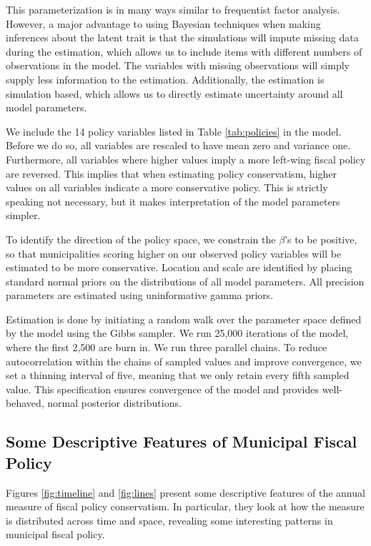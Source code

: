 \documentclass[a4paper,12pt]{article}
\begin{document}
This parameterization is in many ways similar to frequentist factor analysis. However, a major advantage to using Bayesian techniques when making inferences about the latent trait is that the simulations will impute missing data during the estimation, which allows us to include items with different numbers of observations in the model. The variables with missing observations will simply supply less information to the estimation. Additionally, the estimation is simulation based, which allows us to directly estimate uncertainty around all model parameters. 

We include the 14 policy variables listed in Table  \ref{tab:policies} in the model. Before we do so, all variables are rescaled to have mean zero and variance one. Furthermore, all variables where higher values imply a more left-wing fiscal policy are reversed. This implies that when estimating policy conservatism, higher values on all variables indicate a more conservative policy. This is strictly speaking not necessary, but it makes interpretation of the model parameters simpler.

To identify the direction of the policy space, we constrain the $\beta$'s to be positive, so that municipalities scoring higher on our observed policy variables will be estimated to be more conservative. Location and scale are identified by placing standard normal priors on the distributions of all model parameters. All precision parameters are estimated using uninformative gamma priors.

Estimation is done by initiating a random walk over the parameter space defined by the model using the Gibbs sampler. We run 25,000 iterations of the model, where the first 2,500 are burn in. We run three parallel chains. To reduce autocorrelation within the chains of sampled values and improve convergence, we set a thinning interval of five, meaning that we only retain every fifth sampled value. This specification ensures  convergence of the model and provides well-behaved, normal posterior distributions.

\clearpage

\subsection{Some Descriptive Features of Municipal Fiscal Policy} \label{descriptives}

\setcounter{table}{0}
\setcounter{figure}{0}


Figures \ref{fig:timeline} and \ref{fig:lines} present some descriptive features of the annual measure of fiscal policy conservatism. In particular, they look at how the measure is distributed across time and space, revealing some interesting patterns in municipal fiscal policy.
\end{document}
